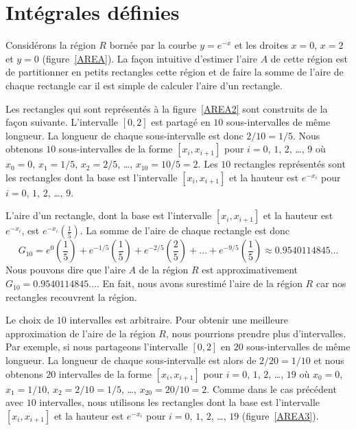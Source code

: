 {\section{Intégrales définies}

Considérons la région $R$ bornée par la courbe $y=e^{-x}$ et les
droites $x=0$, $x=2$ et $y=0$ (figure~\ref{AREA}).  La façon 
intuitive d'estimer l'aire $A$ de cette région est de partitionner en
petits rectangles cette région et de faire la somme de l'aire de
chaque rectangle car il est simple de calculer l'aire d'un rectangle.


Les rectangles qui sont représentés à la figure~\ref{AREA2} sont
construits de la façon suivante.  L'intervalle $[0,2]$ est partagé en
$10$ sous-intervalles de même longueur.  La longueur de chaque 
sous-intervalle est donc $2/10 = 1/5$.  Nous obtenons $10$
sous-intervalles de la forme $[x_i,x_{i+1}]$ pour $i=0$, $1$, $2$,
\ldots, $9$ où $x_0 = 0$, $x_1 = 1/5$, $x_2 = 2/5$, \ldots ,
$x_{10} = 10/5 = 2$.   Les $10$ rectangles représentés sont les
rectangles dont la base est l'intervalle $[x_i, x_{i+1}]$ et la
hauteur est $e^{-x_i}$ pour $i=0$, $1$, $2$, \ldots, $9$.


L'aire d'un rectangle, dont la base est l'intervalle $[x_i, x_{i+1}]$
et la hauteur est $e^{-x_i}$, est $e^{-x_i} \left(\frac{1}{5}\right)$.
La somme de l'aire de chaque rectangle est donc
\[
G_{10} = e^{0} \left(\frac{1}{5}\right)
+ e^{-1/5} \left(\frac{1}{5}\right)
+ e^{-2/5} \left(\frac{2}{5}\right)
+ \ldots + e^{-9/5} \left(\frac{1}{5}\right) \approx
0.9540114845\ldots
\]
Nous pouvons dire que l'aire $A$ de la région $R$ est approximativement
$G_{10} = 0.9540114845\ldots$.  En fait, nous avons surestimé l'aire de la
région $R$ car nos rectangles recouvrent la région.

Le choix de $10$ intervalles est arbitraire.  Pour obtenir une
meilleure approximation de l'aire de la région $R$, nous pourrions
prendre plus d'intervalles.  Par exemple, si nous partageons l'intervalle
$[0,2]$ en $20$ sous-intervalles de même longueur.  La longueur de
chaque sous-intervalle est alors de $2/20 = 1/10$ et nous obtenons $20$
intervalles de la forme $[x_i,x_{i+1}]$ pour $i=0$, $1$, $2$, \ldots,
$19$ où $x_0 = 0$, $x_1 = 1/10$, $x_2 = 2/10 = 1/5$, \ldots,
$x_{20} = 20/10 = 2$. Comme dans le cas précédent avec $10$
intervalles, nous utilisons les rectangles dont la base est l'intervalle
$[x_i, x_{i+1}]$ et la hauteur est $e^{-x_i}$ pour $i=0$, $1$, $2$,
\ldots, $19$ (figure~\ref{AREA3}).

}
